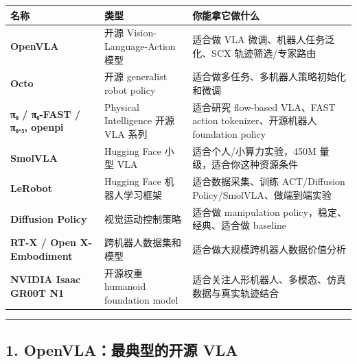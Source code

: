 \documentclass[
  12pt,
]{ctexart}
\begin{document}
\begin{longtable}[]{@{}
  >{\raggedright\arraybackslash}p{}
  >{\raggedright\arraybackslash}p{}
  >{\raggedright\arraybackslash}p{}@{}}
\toprule\noalign{}
\begin{minipage}[b]{\linewidth}\raggedright
名称
\end{minipage} & \begin{minipage}[b]{\linewidth}\raggedright
类型
\end{minipage} & \begin{minipage}[b]{\linewidth}\raggedright
你能拿它做什么
\end{minipage} \\
\midrule\noalign{}
\endhead
\bottomrule\noalign{}
\endlastfoot
\textbf{OpenVLA} & 开源 Vision-Language-Action 模型 & 适合做 VLA
微调、机器人任务泛化、SCX 轨迹筛选/专家路由 \\
\textbf{Octo} & 开源 generalist robot policy &
适合做多任务、多机器人策略初始化和微调 \\
\textbf{π₀ / π₀-FAST / π₀.₅, openpi} & Physical Intelligence 开源 VLA
系列 & 适合研究 flow-based VLA、FAST action tokenizer、开源机器人
foundation policy \\
\textbf{SmolVLA} & Hugging Face 小型 VLA & 适合个人/小算力实验，450M
量级，适合你这种资源条件 \\
\textbf{LeRobot} & Hugging Face 机器人学习框架 & 适合数据采集、训练
ACT/Diffusion Policy/SmolVLA、做端到端实验 \\
\textbf{Diffusion Policy} & 视觉运动控制策略 & 适合做 manipulation
policy，稳定、经典、适合做 baseline \\
\textbf{RT-X / Open X-Embodiment} & 跨机器人数据集和模型 &
适合做大规模跨机器人数据价值分析 \\
\textbf{NVIDIA Isaac GR00T N1} & 开源权重 humanoid foundation model &
适合关注人形机器人、多模态、仿真数据与真实轨迹结合 \\
\end{longtable}

\begin{center}\rule{0.5\linewidth}{0.5pt}\end{center}

\subsection{1. OpenVLA：最典型的开源
VLA}\label{openvlaux6700ux5178ux578bux7684ux5f00ux6e90-vla}
\end{document}
